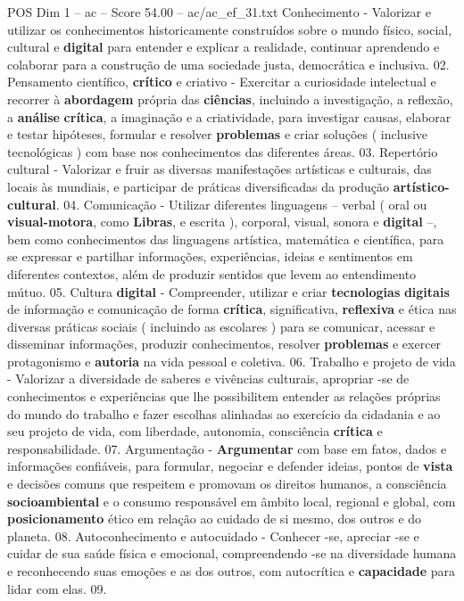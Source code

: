 \begin{textsample}{POS Dim 1 – ac – Score 54.00 – ac/ac\_ef\_31.txt}
Conhecimento - Valorizar e utilizar os conhecimentos historicamente construídos sobre o mundo físico, social, cultural e \textbf{digital} para entender e explicar a realidade, continuar aprendendo e colaborar para a construção de uma sociedade justa, democrática e inclusiva. 02.
Pensamento científico, \textbf{crítico} e criativo - Exercitar a curiosidade intelectual e recorrer à \textbf{abordagem} própria das \textbf{ciências}, incluindo a investigação, a reflexão, a \textbf{análise} \textbf{crítica}, a imaginação e a criatividade, para investigar causas, elaborar e testar hipóteses, formular e resolver \textbf{problemas} e criar soluções ( inclusive tecnológicas ) com base nos conhecimentos das diferentes áreas. 03.
Repertório cultural - Valorizar e fruir as diversas manifestações artísticas e culturais, das locais às mundiais, e participar de práticas diversificadas da produção \textbf{artístico-cultural}. 04.
Comunicação - Utilizar diferentes linguagens – verbal ( oral ou \textbf{visual-motora}, como \textbf{Libras}, e escrita ), corporal, visual, sonora e \textbf{digital} –, bem como conhecimentos das linguagens artística, matemática e científica, para se expressar e partilhar informações, experiências, ideias e sentimentos em diferentes contextos, além de produzir sentidos que levem ao entendimento mútuo. 05.
Cultura \textbf{digital} - Compreender, utilizar e criar \textbf{tecnologias} \textbf{digitais} de informação e comunicação de forma \textbf{crítica}, significativa, \textbf{reflexiva} e ética nas diversas práticas sociais ( incluindo as escolares ) para se comunicar, acessar e disseminar informações, produzir conhecimentos, resolver \textbf{problemas} e exercer protagonismo e \textbf{autoria} na vida pessoal e coletiva. 06.
Trabalho e projeto de vida - Valorizar a diversidade de saberes e vivências culturais, apropriar -se de conhecimentos e experiências que lhe possibilitem entender as relações próprias do mundo do trabalho e fazer escolhas alinhadas ao exercício da cidadania e ao seu projeto de vida, com liberdade, autonomia, consciência \textbf{crítica} e responsabilidade. 07.
Argumentação - \textbf{Argumentar} com base em fatos, dados e informações confiáveis, para formular, negociar e defender ideias, pontos de \textbf{vista} e decisões comuns que respeitem e promovam os direitos humanos, a consciência \textbf{socioambiental} e o consumo responsável em âmbito local, regional e global, com \textbf{posicionamento} ético em relação ao cuidado de si mesmo, dos outros e do planeta. 08.
Autoconhecimento e autocuidado - Conhecer -se, apreciar -se e cuidar de sua saúde física e emocional, compreendendo -se na diversidade humana e reconhecendo suas emoções e as dos outros, com autocrítica e \textbf{capacidade} para lidar com elas. 09.

\end{textsample}
